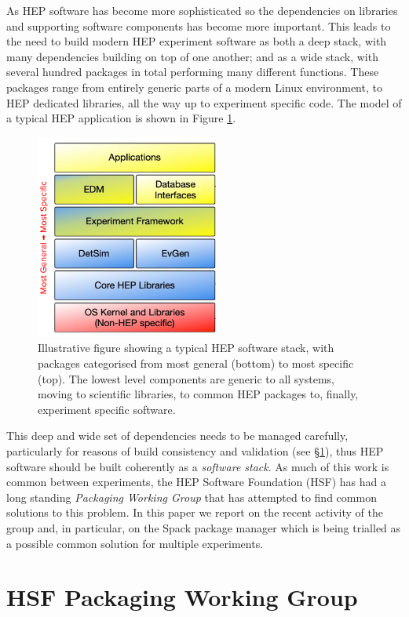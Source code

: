 \documentclass{webofc}
\begin{document}
As HEP software has become more sophisticated so the dependencies on libraries
and supporting software components has become more important. This leads to the
need to build modern HEP experiment software as both a deep stack, with many
dependencies building on top of one another; and as a wide stack, with several
hundred packages in total performing many different functions.
These packages range from entirely generic
parts of a modern Linux environment, to HEP dedicated libraries, all the way up to
experiment specific code. The model of a typical HEP application is shown in
Figure \ref{fig:stack}.

\begin{figure}[h]
\centering
\includegraphics[width=6cm]{stack.png}
\caption{Illustrative figure showing a typical HEP software stack, with packages
categorised from most general (bottom) to most specific (top). The lowest level
components are generic to all systems, moving to scientific libraries, to common
HEP packages to, finally, experiment specific software.}
\label{fig:stack}
\end{figure}

This deep and wide set of dependencies needs to be managed carefully,
particularly for reasons of build consistency and validation (see \S\ref{hsfpwg}), thus HEP
software should be built coherently as a \emph{software stack}. As much of
this work is common between experiments, the HEP Software Foundation (HSF) has
had a long standing \emph{Packaging Working Group}\cite{HSFPWG} that has attempted to find
common solutions to this problem. In this paper we report on the recent activity
of the group and, in particular, on the Spack package manager\cite{10.1145/2807591.2807623} which is being
trialled as a possible common solution for multiple experiments.

\section{HSF Packaging Working Group}
\label{hsfpwg}
\end{document}
